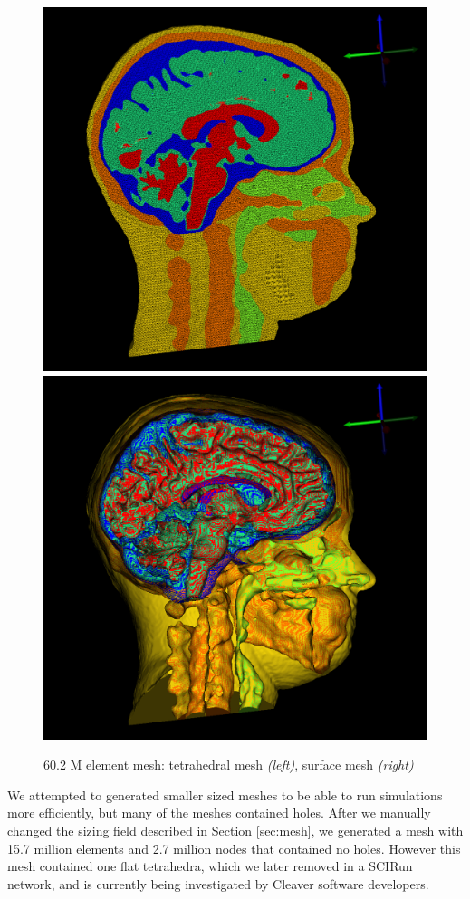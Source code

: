 \begin{figure}[H]
\begin{center}
\includegraphics[width=.49\textwidth]{Figures/bigmesh_1}
\includegraphics[width=.49\textwidth]{Figures/bigmesh_surface}
\caption{60.2 M element mesh: tetrahedral mesh \textit{(left)}, surface mesh \textit{(right)}}
\label{fig:bigmesh}
\end{center}
\end{figure}

We attempted to generated smaller sized meshes to be able to run simulations more efficiently, but many of the meshes contained holes. After we manually changed the sizing field described in Section \ref{sec:mesh}, we generated a mesh with 15.7 million elements and 2.7 million nodes that contained no holes. However this mesh contained one flat tetrahedra, which we later removed in a SCIRun network, and is currently being investigated by Cleaver software developers.

